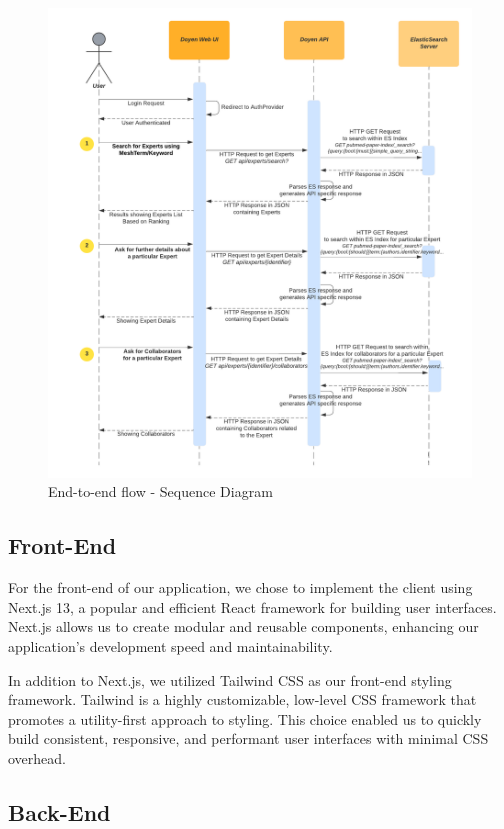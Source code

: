 \begin{figure}[htp]
    \centering
    \includegraphics[width=\textwidth]{Images/SequenceDiagram_GetExperts.png}
    \caption{End-to-end flow - Sequence Diagram}
    \label{fig:sequence-diagram}
\end{figure}


\subsection{Front-End}

For the front-end of our application, we chose to implement the client using Next.js 13, a popular and efficient React framework for building user interfaces. Next.js allows us to create modular and reusable components, enhancing our application's development speed and maintainability.

In addition to Next.js, we utilized Tailwind CSS as our front-end styling framework. Tailwind is a highly customizable, low-level CSS framework that promotes a utility-first approach to styling. This choice enabled us to quickly build consistent, responsive, and performant user interfaces with minimal CSS overhead.

\subsection{Back-End}

